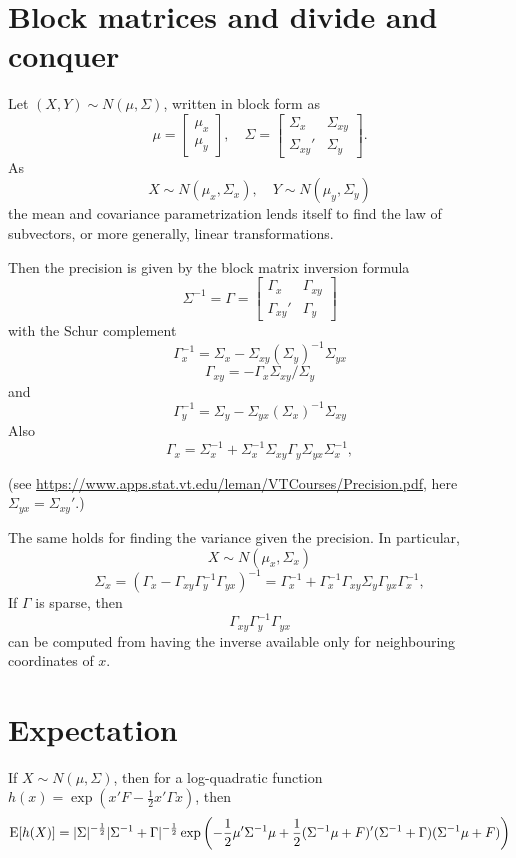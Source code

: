 \documentclass[11pt]{article}
\begin{document}
\section{Block matrices and divide and conquer}
Let $ (X,Y) \sim N(\mu, \Sigma)$, written in block form as
\[
\mu = \begin{bmatrix}\mu_x\\ \mu_y\end{bmatrix}, \quad \Sigma = \begin{bmatrix}\Sigma_{x} & \Sigma_{xy} \\ \Sigma_{xy}' &\Sigma_{y} \end{bmatrix}.
\]
As
\[
X \sim N(\mu_x, \Sigma_x), \quad Y \sim N(\mu_y, \Sigma_y)
\]
the mean and covariance parametrization lends itself to find the law of subvectors, or more generally, linear transformations.


Then the precision is given by the block matrix inversion formula
\[
\Sigma^{-1} = \Gamma = 
\begin{bmatrix}\Gamma_{x} & \Gamma_{xy} \\ \Gamma_{xy}' &\Gamma_{y} \end{bmatrix}
\]
with the Schur complement
\[
\Gamma_{x}^{-1} = \Sigma_{x} - \Sigma_{xy}(\Sigma_{y})^{-1} \Sigma_{yx}
\]
\[
\Gamma_{xy} = -\Gamma_{x} \Sigma_{xy} / \Sigma_y
\]
and
\[
\Gamma_{y}^{-1} = \Sigma_{y} - \Sigma_{yx}(\Sigma_{x})^{-1} \Sigma_{xy}
\]
Also
\[
\Gamma_x = \Sigma_x^{{-1}}+\Sigma_x^{{-1}}\Sigma_{xy}\Gamma_y\Sigma_{yx}\Sigma_x^{{-1}},
\]



(see \url{https://www.apps.stat.vt.edu/leman/VTCourses/Precision.pdf}, here $\Sigma_{yx} = \Sigma_{xy}'$.)

The same holds for finding the variance  given the precision.
In particular,
\[
X \sim N(\mu_x, \Sigma_x)
\]
\[
\Sigma_x =  (\Gamma_x - \Gamma_{xy}\Gamma_y^{-1} \Gamma_{yx})^{-1} = \Gamma_x^{{-1}}+\Gamma_x^{{-1}}\Gamma_{xy}\Sigma_y\Gamma_{yx}\Gamma_x^{{-1}},
\]
If $\Gamma$ is sparse, then 
\[
  \Gamma_{xy}\Gamma_y^{-1} \Gamma_{yx} 
\]
can be computed from having the inverse available only for neighbouring coordinates of $x$.
\section{Expectation}
If $X \sim N(\mu, \Sigma)$, then for a log-quadratic function $h(x) = \exp(x'F - \frac12 x' \Gamma x)$,
then
\[
\mathrm{E}[ h(X)] = |\Sigma|^{-\frac12}|\Sigma^{-1}+\Gamma|^{-\frac12}\exp\left(-\frac12 \mu'\Sigma^{-1}\mu + \frac12(\Sigma^{-1}\mu + F)'(\Sigma^{-1}+\Gamma)(\Sigma^{-1}\mu + F)\right)
\]
\end{document}
